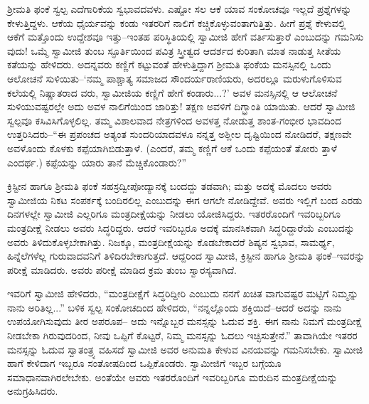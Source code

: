 ಶ್ರೀಮತಿ ಫಂಕೆ ಸ್ವಲ್ಪ ಎದೆಗಾರಿಕೆಯ ಸ್ವಭಾವದವಳು. ಎಷ್ಟೋ ಸಲ ಆಕೆ ಯಾವ ಸಂಕೋಚವೂ ಇಲ್ಲದೆ ಪ್ರಶ್ನೆಗಳನ್ನು ಕೇಳುತ್ತಿದ್ದಳು. ಆಕೆಯ ಧೈರ್ಯವನ್ನು ಕಂಡು ಇತರರಿಗೆ ನಾಲಿಗೆ ಕಚ್ಚಿಕೊಳ್ಳುವಂತಾಗುತ್ತಿತ್ತು. ಹೀಗೆ ಪ್ರಶ್ನೆ ಕೇಳುವಲ್ಲಿ ಆಕೆಗೆ ಮತ್ತೊಂದು ಉದ್ದೇಶವೂ ಇತ್ತು–ಇಂತಹ ಪರಿಸ್ಥಿತಿಯಲ್ಲಿ ಸ್ವಾಮೀಜಿ ಹೇಗೆ ವರ್ತಿಸುತ್ತಾರೆ ಎಂಬುದನ್ನು ಗಮನಿಸು ವುದು! ಒಮ್ಮೆ ಸ್ವಾಮೀಜಿ ತುಂಬ ಸ್ಫೂರ್ತಿಯಿಂದ ಪವಿತ್ರ ಸ್ತ್ರೀತ್ವದ ಆದರ್ಶದ ಕುರಿತಾಗಿ ಮಾತ ನಾಡುತ್ತ ಸೀತೆಯ ಕತೆಯನ್ನು ಹೇಳಿದರು. ಅದನ್ನವರು ಕಣ್ಣಿಗೆ ಕಟ್ಟುವಂತೆ ಹೇಳುತ್ತಿದ್ದಾಗ ಶ್ರೀಮತಿ ಫಂಕೆಯ ಮನಸ್ಸಿನಲ್ಲಿ ಒಂದು ಆಲೋಚನೆ ಸುಳಿಯಿತು–‘ನಮ್ಮ ಪಾಶ್ಚಾತ್ಯ ಸಮಾಜದ ಸೌಂದರ್ಯರಾಣಿಯರು, ಅದರಲ್ಲೂ ಮರುಳುಗೊಳಿಸುವ ಕಲೆಯಲ್ಲಿ ನಿಷ್ಣಾತರಾದ ವರು, ಸ್ವಾಮೀಜಿಯ ಕಣ್ಣಿಗೆ ಹೇಗೆ ಕಂಡಾರು...?’ ಅವಳ ಮನಸ್ಸಿನಲ್ಲಿ ಆ ಆಲೋಚನೆ ಸುಳಿಯುವಷ್ಟರಲ್ಲೇ ಅದು ಅವಳ ನಾಲಿಗೆಯಿಂದ ಜಾರಿತ್ತು! ತಕ್ಷಣ ಅವಳಿಗೆ ದಿಗ್ಭ್ರಾಂತಿ ಯಾಯಿತು. ಆದರೆ ಸ್ವಾಮೀಜಿ ಸ್ವಲ್ಪವೂ ಕಸಿವಿಸಿಗೊಳ್ಳಲಿಲ್ಲ. ತಮ್ಮ ವಿಶಾಲವಾದ ನೇತ್ರಗಳಿಂದ ಅವಳತ್ತ ನೋಡುತ್ತ ಶಾಂತ-ಗಂಭೀರ ಭಾವದಿಂದ ಉತ್ತರಿಸಿದರು–“ಈ ಪ್ರಪಂಚದ ಅತ್ಯಂತ ಸುಂದರಿಯಾದವಳೂ ನನ್ನತ್ತ ಅಶ್ಲೀಲ ದೃಷ್ಟಿಯಿಂದ ನೋಡಿದರೆ, ತಕ್ಷಣವೇ ಅವಳೊಂದು ಕೊಳಕು ಕಪ್ಪೆಯಾಗಿಬಿಡುತ್ತಾಳೆ. (ಎಂದರೆ, ತಮ್ಮ ಕಣ್ಣಿಗೆ ಆಕೆ ಒಂದು ಕಪ್ಪೆಯಂತೆ ತೋರು ತ್ತಾಳೆ ಎಂದರ್ಥ.) ಕಪ್ಪೆಯನ್ನು ಯಾರು ತಾನೆ ಮೆಚ್ಚಿಕೊಂಡಾರು?”

ಕ್ರಿಸ್ಟೀನ ಹಾಗೂ ಶ್ರೀಮತಿ ಫಂಕೆ ಸಹಸ್ರದ್ವೀಪೋದ್ಯಾನಕ್ಕೆ ಬಂದದ್ದು ತಡವಾಗಿ; ಮತ್ತು ಅದಕ್ಕೆ ಮೊದಲು ಅವರು ಸ್ವಾಮೀಜಿಯ ನಿಕಟ ಸಂಪರ್ಕಕ್ಕೆ ಬಂದಿರಲಿಲ್ಲ ಎಂಬುದನ್ನು ಈಗ ಆಗಲೇ ನೋಡಿದ್ದೇವೆ. ಅವರು ಇಲ್ಲಿಗೆ ಬಂದ ಎರಡು ದಿನಗಳಲ್ಲೇ ಸ್ವಾಮೀಜಿ ಎಲ್ಲರಿಗೂ ಮಂತ್ರದೀಕ್ಷೆಯನ್ನು ನೀಡಲು ಯೋಜಿಸಿದ್ದರು. ಇತರರೊಂದಿಗೆ ಇವರಿಬ್ಬರಿಗೂ ಮಂತ್ರದೀಕ್ಷೆ ನೀಡಲು ಅವರು ಸಿದ್ಧರಿದ್ದರು. ಆದರೆ ಇವರಿಬ್ಬರೂ ಅದಕ್ಕೆ ಮಾನಸಿಕವಾಗಿ ಸಿದ್ಧರಿದ್ದಾರೆಯೆ ಎಂಬುದನ್ನು ಅವರು ತಿಳಿದುಕೊಳ್ಳಬೇಕಾಗಿತ್ತು. ನಿಜಕ್ಕೂ, ಮಂತ್ರದೀಕ್ಷೆಯನ್ನು ಕೊಡಬೇಕಾದರೆ ಶಿಷ್ಯನ ಸ್ವಭಾವ, ಸಾಮರ್ಥ್ಯ, ಹಿನ್ನೆಲೆಗಳೆಲ್ಲ ಗುರುವಾದವನಿಗೆ ತಿಳಿದಿರಬೇಕಾಗುತ್ತದೆ. ಆದ್ದರಿಂದ ಸ್ವಾಮೀಜಿ, ಕ್ರಿಸ್ಟೀನ ಹಾಗೂ ಶ್ರೀಮತಿ ಫಂಕೆ–ಇವರನ್ನು ಪರೀಕ್ಷೆ ಮಾಡಿದರು. ಅವರು ಪರೀಕ್ಷೆ ಮಾಡಿದ ಕ್ರಮ ತುಂಬ ಸ್ವಾರಸ್ಯವಾಗಿದೆ.

ಇವರಿಗೆ ಸ್ವಾಮೀಜಿ ಹೇಳಿದರು, “ಮಂತ್ರದೀಕ್ಷೆಗೆ ಸಿದ್ಧರಿದ್ದೀರಿ ಎಂಬುದು ನನಗೆ ಖಚಿತ ವಾಗುವಷ್ಟರ ಮಟ್ಟಿಗೆ ನಿಮ್ಮನ್ನು ನಾನು ಅರಿತಿಲ್ಲ...” ಬಳಿಕ ಸ್ವಲ್ಪ ಸಂಕೋಚದಿಂದ ಹೇಳಿದರು, “ನನ್ನಲ್ಲೊಂದು ಶಕ್ತಿಯಿದೆ–ಆದರೆ ಅದನ್ನು ನಾನು ಉಪಯೋಗಿಸುವುದು ತೀರ ಅಪರೂಪ– ಅದು ಇನ್ನೊಬ್ಬರ ಮನಸ್ಸನ್ನು ಓದುವ ಶಕ್ತಿ. ಈಗ ನಾನು ನಿಮಗೆ ಮಂತ್ರದೀಕ್ಷೆ ನೀಡಬೇಕಾ ಗಿರುವುದರಿಂದ, ನೀವು ಒಪ್ಪಿಗೆ ಕೊಟ್ಟರೆ, ನಿಮ್ಮ ಮನಸ್ಸನ್ನು ಓದಲು ಇಚ್ಛಿಸುತ್ತೇನೆ.” ತಾವಾಗಿಯೇ ಇತರರ ಮನಸ್ಸನ್ನು ಓದುವ ಸ್ವಾತಂತ್ರ್ಯ ವಹಿಸದೆ ಸ್ವಾಮೀಜಿ ಅವರ ಅನುಮತಿ ಕೇಳುವ ವಿನಯವನ್ನು ಗಮನಿಸಬೇಕು. ಸ್ವಾಮೀಜಿ ಹಾಗೆ ಕೇಳಿದಾಗ ಇಬ್ಬರೂ ಸಂತೋಷದಿಂದ ಒಪ್ಪಿಕೊಂಡರು. ಸ್ವಾಮೀಜಿಗೆ ಇಬ್ಬರ ಬಗ್ಗೆಯೂ ಸಮಾಧಾನವಾಗಿರಲೇಬೇಕು. ಅಂತೆಯೇ ಅವರು ಇತರರೊಂದಿಗೆ ಇವರಿಬ್ಬರಿಗೂ ಮರುದಿನ ಮಂತ್ರದೀಕ್ಷೆಯನ್ನು ಅನುಗ್ರಹಿಸಿದರು.

